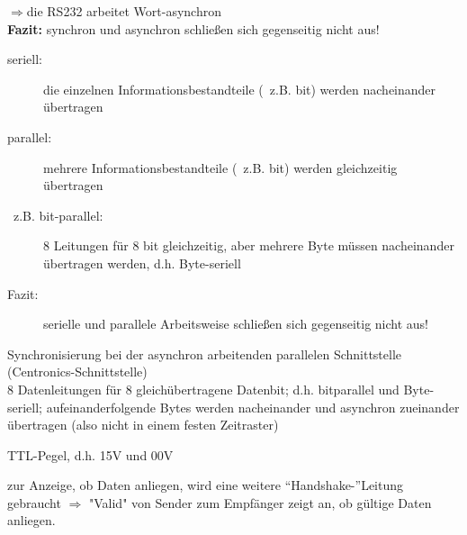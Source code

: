 $\Rightarrow$die RS232 arbeitet Wort-asynchron\\
\textbf{Fazit:} synchron und asynchron schließen sich gegenseitig nicht aus!
\par
\begin{description}
\item[seriell:] die einzelnen Informationsbestandteile (~z.B. bit) werden nacheinander übertragen
\item[parallel:] mehrere Informationsbestandteile (~z.B. bit) werden gleichzeitig übertragen
\item[~z.B. bit-parallel:] 8 Leitungen für 8 bit gleichzeitig, aber mehrere Byte müssen nacheinander übertragen werden, d.h. Byte-seriell
\item[Fazit:] serielle und parallele Arbeitsweise schließen sich gegenseitig nicht aus!
\end{description}
Synchronisierung bei der asynchron arbeitenden parallelen Schnittstelle (Centronics-Schnittstelle)\\
8 Datenleitungen für 8 gleichübertragene Datenbit; d.h. bitparallel und Byte-seriell; aufeinanderfolgende Bytes werden nacheinander und asynchron zueinander übertragen (also nicht in einem festen Zeitraster)
\par
TTL-Pegel, d.h. 1\hat{=}5V und 0\hat{=}0V
\par
zur Anzeige, ob Daten anliegen, wird eine weitere “Handshake-”Leitung gebraucht $\Rightarrow$ "Valid" von Sender zum Empfänger zeigt an, ob gültige Daten anliegen.